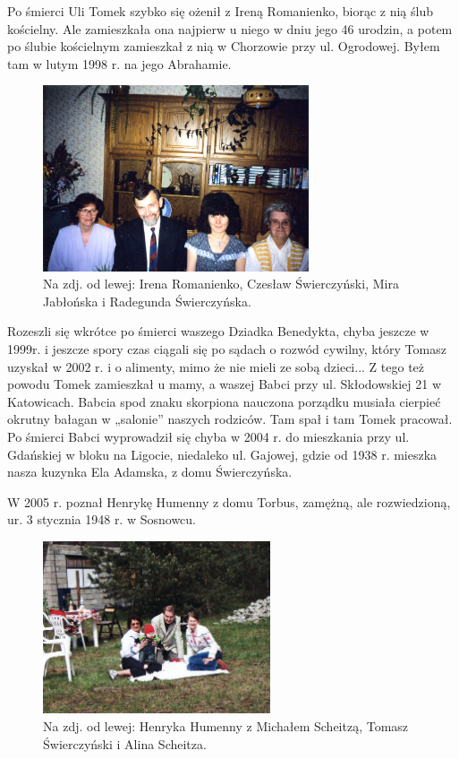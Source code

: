 Po śmierci Uli Tomek szybko się ożenił z Ireną Romanienko, biorąc z nią ślub kościelny. Ale zamieszkała ona najpierw u niego w dniu jego 46 urodzin, a potem po ślubie kościelnym zamieszkał z nią w Chorzowie przy ul. Ogrodowej. Byłem tam w lutym 1998 r. na jego Abrahamie. 
\begin{figure}[!h]
\begin{center}
\includegraphics[width=0.7\textwidth]{photo/irena_romanienko.jpg}
\caption[Irena Romanienko]{Na zdj. od lewej: Irena Romanienko, Czesław Świerczyński, Mira Jabłońska i Radegunda Świerczyńska.}
\end{center}
\end{figure}

Rozeszli się wkrótce po śmierci waszego Dziadka Benedykta, chyba jeszcze w 1999r. i jeszcze spory czas ciągali się po sądach o rozwód cywilny, który Tomasz uzyskał w 2002 r. i o alimenty, mimo że nie mieli ze sobą dzieci... Z tego też powodu Tomek zamieszkał u mamy, a waszej Babci przy ul. Skłodowskiej 21 w Katowicach. Babcia spod znaku skorpiona nauczona porządku musiała cierpieć okrutny bałagan w „salonie” naszych rodziców. Tam spał i tam Tomek pracował. Po śmierci Babci wyprowadził się chyba w 2004 r. do mieszkania przy ul. Gdańskiej w bloku na Ligocie, niedaleko ul. Gajowej, gdzie od 1938 r. mieszka nasza kuzynka Ela Adamska, z domu Świerczyńska. 

W 2005 r. poznał Henrykę Humenny z domu Torbus, zamężną, ale rozwiedzioną, ur. 3 stycznia 1948 r. w Sosnowcu.
\begin{figure}[!h]
\begin{center}
\includegraphics[width=0.6\textwidth]{photo/henryka_humenny_1.jpg}
\caption[Henryka Humenny]{Na zdj. od lewej: Henryka Humenny z Michałem Scheitzą, Tomasz Świerczyński i Alina Scheitza.}
\end{center}
\end{figure}


